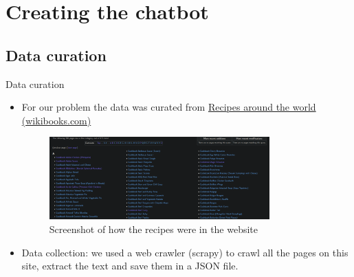 \documentclass[10pt, t]{beamer}
\begin{document}
    \section{Creating the chatbot}
    \subsection{Data curation}
    \begin{frame}{Data curation}
        \begin{itemize}
            \item For our problem the data was curated from \href{https://en.wikibooks.org/wiki/Category:Recipes_with_metric_units}{Recipes around the world (wikibooks.com)}
            \begin{figure}[H]
                \centering
                \includegraphics[width=0.8\textwidth]{recipes-website.png}
                \caption[]{Screenshot of how the recipes were in the website}
            \end{figure}
            \item Data collection: we used a web crawler (scrapy) to crawl all the pages on this site, extract the text and save them in a JSON file.
        \end{itemize}
    \end{frame}
\end{document}
